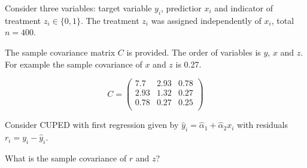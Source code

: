 
\begin{question}
Consider three variables: target variable \(y_i\), predictior \(x_i\) and indicator of treatment \(z_i \in \{0,1\}\).
The treatment \(z_i\) was assigned independently of \(x_i\), total \(n=400\).

The sample covariance matrix \(C\) is provided.
The order of variables is \(y\), \(x\) and \(z\).
For example the sample covariance of \(x\) and \(z\) is 0.27.

\[
C = \begin{pmatrix}
        7.7 & 2.93 & 0.78 \\
        2.93 & 1.32 & 0.27 \\
        0.78 & 0.27 & 0.25 \\
\end{pmatrix}    
\]

Consider CUPED with first regression given by \(\hat y_i = \hat\alpha_1 + \hat\alpha_2 x_i\) with residuals \(r_i = y_i - \hat y_i\).

What is the sample covariance of \(r\) and \(z\)?
\end{question}


